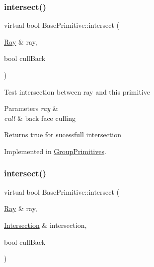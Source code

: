 \subsubsection{\texorpdfstring{intersect()}{intersect()}\hspace{0.1cm}{\footnotesize\ttfamily [1/2]}}
{\footnotesize\ttfamily virtual bool Base\+Primitive\+::intersect (\begin{DoxyParamCaption}\item[{\mbox{\hyperlink{class_ray}{Ray}} \&}]{ray,  }\item[{bool}]{cull\+Back }\end{DoxyParamCaption})\hspace{0.3cm}{\ttfamily [pure virtual]}}

Test intersection between ray and this primitive 
\begin{DoxyParams}{Parameters}
{\em ray} & \\
\hline
{\em cull} & back face culling \\
\hline
\end{DoxyParams}
\begin{DoxyReturn}{Returns}
true for sucessfull intersection 
\end{DoxyReturn}


Implemented in \mbox{\hyperlink{class_group_primitives_a17bca38224e782eb6660774b34947397}{Group\+Primitives}}.

\mbox{\label{class_base_primitive_a1f9cb5f2c71f2e1f985513a154f22712}} 
\subsubsection{\texorpdfstring{intersect()}{intersect()}\hspace{0.1cm}{\footnotesize\ttfamily [2/2]}}
{\footnotesize\ttfamily virtual bool Base\+Primitive\+::intersect (\begin{DoxyParamCaption}\item[{\mbox{\hyperlink{class_ray}{Ray}} \&}]{ray,  }\item[{\mbox{\hyperlink{class_intersection}{Intersection}} \&}]{intersection,  }\item[{bool}]{cull\+Back }\end{DoxyParamCaption})\hspace{0.3cm}{\ttfamily [pure virtual]}}

